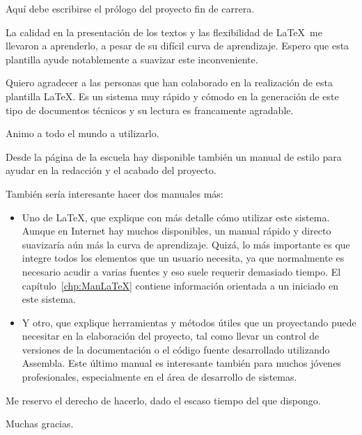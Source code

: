 

  Aquí debe escribirse el prólogo del proyecto fin de carrera.
  \medskip
  
  La calidad en la presentación de los textos y las flexibilidad de \LaTeX\ me llevaron a aprenderlo, a pesar de su difícil curva de aprendizaje.\nli
  Espero que esta plantilla ayude notablemente a suavizar este inconveniente.
  
  Quiero agradecer a las personas que han colaborado en la realización de esta plantilla \LaTeX. Es un sistema muy rápido y cómodo en la generación de este tipo de documentos técnicos y su lectura es francamente agradable.
  
  Animo a todo el mundo a utilizarlo.
  
  Desde la página de la escuela hay disponible también un manual de estilo para ayudar en la redacción y el acabado del proyecto.

  También sería interesante hacer dos manuales más: 
\begin{itemize}
  \item{Uno de \LaTeX, que explique con más detalle cómo utilizar este sistema. Aunque en Internet hay muchos disponibles, un manual rápido y directo suavizaría aún más la curva de aprendizaje.\nli
    Quizá, lo más importante es que integre todos los elementos que un usuario necesita, ya que normalmente es necesario acudir a varias fuentes y eso suele requerir demasiado tiempo.\nli
    El capítulo~\ref{chp:ManLaTeX} contiene información orientada a un iniciado en este sistema.}
  
  \item{Y otro, que explique herramientas y métodos útiles que un proyectando puede necesitar en la elaboración del proyecto, tal como llevar un control de versiones de la documentación o el código fuente desarrollado utilizando Assembla\TM. Este último manual es interesante también para muchos jóvenes profesionales, especialmente en el área de desarrollo de sistemas.}
\end{itemize}

  Me reservo el derecho de hacerlo, dado el escaso tiempo del que dispongo.
  \bigskip
  
  Muchas gracias.

\chapterend
